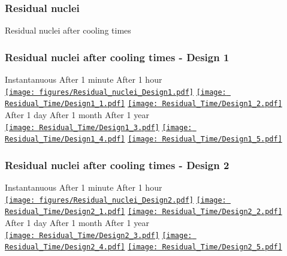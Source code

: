 \documentclass[xcolor={dvipsnames}]{beamer}
\begin{document}
\subsubsection{Residual nuclei}
\begin{frame}{Residual nuclei after cooling times}
  \begin{center}
  \end{center}
\end{frame}
\begin{frame}
  \frametitle{Residual nuclei after cooling times - Design 1}
  \hypertarget{residualtimesprev_Design1}{}
  \centering
    \hspace*{1.6cm} Instantanuous \hfill After 1 minute \hfill After 1 hour \hspace*{1.8cm} \\
  \hyperlink{Residual_nuclei_Design1}{\texttt{[image: figures/Residual\_nuclei\_Design1.pdf]}}
  \hyperlink{Residual_nuclei_minute_Design1}{\texttt{[image: Residual\_Time/Design1\_1.pdf]}}
  \hyperlink{Residual_nuclei_hour_Design1}{\texttt{[image: Residual\_Time/Design1\_2.pdf]}}\\
    \hspace*{1.6cm} After 1 day \hfill After 1 month \hfill After 1 year\hspace*{1.8cm} \\
  \hyperlink{Residual_nuclei_day_Design1}{\texttt{[image: Residual\_Time/Design1\_3.pdf]}}
  \hyperlink{Residual_nuclei_month_Design1}{\texttt{[image: Residual\_Time/Design1\_4.pdf]}}
  \hyperlink{Residual_nuclei_year_Design1}{\texttt{[image: Residual\_Time/Design1\_5.pdf]}}
\end{frame}
\begin{frame}
  \frametitle{Residual nuclei after cooling times - Design 2}
  \hypertarget{residualtimesprev_Design2}{}
  \centering
    \hspace*{1.6cm} Instantanuous \hfill After 1 minute \hfill After 1 hour \hspace*{1.8cm} \\
  \hyperlink{Residual_nuclei_Design2}{\texttt{[image: figures/Residual\_nuclei\_Design2.pdf]}}
  \hyperlink{Residual_nuclei_minute_Design2}{\texttt{[image: Residual\_Time/Design2\_1.pdf]}}
  \hyperlink{Residual_nuclei_hour_Design2}{\texttt{[image: Residual\_Time/Design2\_2.pdf]}}\\
    \hspace*{1.6cm} After 1 day \hfill After 1 month \hfill After 1 year\hspace*{1.8cm} \\
  \hyperlink{Residual_nuclei_day_Design2}{\texttt{[image: Residual\_Time/Design2\_3.pdf]}}
  \hyperlink{Residual_nuclei_month_Design2}{\texttt{[image: Residual\_Time/Design2\_4.pdf]}}
  \hyperlink{Residual_nuclei_year_Design2}{\texttt{[image: Residual\_Time/Design2\_5.pdf]}}
\end{frame}
\end{document}
